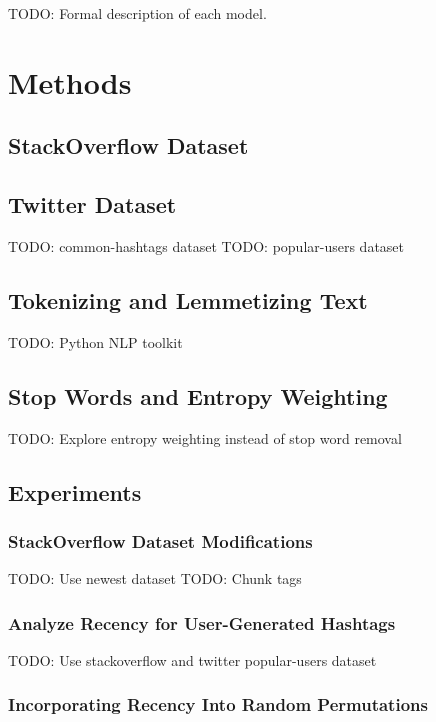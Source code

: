 \documentclass[man]{apa6}
\begin{document}
TODO: Formal description of each model.

\section{Methods}

\subsection{StackOverflow Dataset}

\cite{DataDump2013}

\subsection{Twitter Dataset}

TODO: common-hashtags dataset
TODO: popular-users dataset

\subsection{Tokenizing and Lemmetizing Text}

TODO: Python NLP toolkit \cite{Bird2009}

\subsection{Stop Words and Entropy Weighting}

TODO: Explore entropy weighting instead of stop word removal \cite{Dumais1991}

\subsection{Experiments}

\subsubsection{StackOverflow Dataset Modifications}

TODO: Use newest dataset
TODO: Chunk tags

\subsubsection{Analyze Recency for User-Generated Hashtags}

TODO: Use stackoverflow and twitter popular-users dataset

\subsubsection{Incorporating Recency Into Random Permutations}
\end{document}
